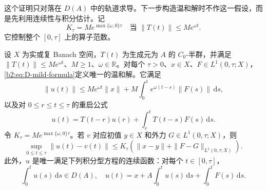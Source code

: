 这个证明只对落在 \(D(A)\) 中的轨道求导。下一步构造温和解时不作这一假设，而是先利用连续性与积分估计。记
\[
 K_\tau=Me^{\max\{\omega,0\}\tau}
 \quad\text{当 }\|T(t)\|\leq Me^{\omega t}.
\]
它控制整个 \([0,\tau]\) 上的算子范数。

\begin{theorem}[可积外力与积分型方程]
\label{b2:thm:D-mild-integrable}
设 \(X\) 为实或复 Banach 空间，\(T(t)\) 为生成元为 \(A\) 的 \(C_0\)-半群，并满足 \(\|T(t)\|\leq Me^{\omega t}\)、\(M\geq1\)、\(\omega\in\mathbb R\)。对每个 \(\tau>0\)、\(x\in X\)、\(F\in L^1(0,\tau;X)\)，\eqref{b2:eq:D-mild-formula}定义唯一的温和解。它满足
\[
 \|u(t)\|\leq Me^{\omega t}\|x\|
       +M\int_0^t e^{\omega(t-s)}\|F(s)\|\,\mathrm ds,
\]
以及对 \(0\leq r\leq t\leq\tau\) 的重启公式
\begin{equation}\label{b2:eq:D-restart}
 u(t)=T(t-r)u(r)+\int_r^tT(t-s)F(s)\,\mathrm ds.
\end{equation}
令 \(K_\tau=Me^{\max\{\omega,0\}\tau}\)。若 \(v\) 对应初值 \(y\in X\) 和外力 \(G\in L^1(0,\tau;X)\)，则
\[
 \sup_{0\leq t\leq\tau}\|u(t)-v(t)\|
 \leq K_\tau\left(\|x-y\|+\|F-G\|_{L^1(0,\tau;X)}\right).
\]
此外，\(u\) 是唯一满足下列积分型方程的连续函数：对每个 \(t\in[0,\tau]\)，
\begin{equation}\label{b2:eq:D-integrated-equation}
 \int_0^tu(s)\,\mathrm ds\in D(A),\quad
 u(t)=x+A\int_0^tu(s)\,\mathrm ds+\int_0^tF(s)\,\mathrm ds.
\end{equation}
\end{theorem}
